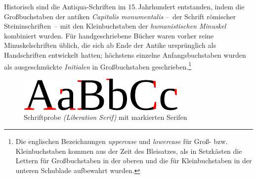 Historisch sind die Antiqua-Schriften im 15.\,Jahrhundert entstanden,
indem die Großbuchstaben der antiken \emph{Capitalis monumentalis}
--~der Schrift römischer Steininschriften~-- mit den Kleinbuchstaben
der \emph{humanistischen Minuskel} kombiniert wurden.  Für
handgeschriebene Bücher waren vorher reine Minuskelschriften üblich,
die sich ab Ende der Antike ursprünglich als Handschriften entwickelt
hatten; höchstens einzelne Anfangsbuchstaben wurden als ausgeschmückte
\emph{Initialen} in Großbuchstaben geschrieben.\footnote{Die
  englischen Bezeichnungen \emph{\foreignlanguage{british}{uppercase}}
  und \emph{\foreignlanguage{british}{lowercase}} für Groß-
  bzw. Kleinbuchstaben kommen aus der Zeit des Bleisatzes, als in
  Setzkästen die Lettern für Großbuchstaben in der oberen und die für
  Kleinbuchstaben in der unteren Schublade aufbewahrt wurden.}

\begin{figure}
  \centering
  \includegraphics[width=.4\textwidth]{Serifen}
  \caption{Schriftprobe \emph{(Liberation Serif)} mit markierten
    Serifen\protect\footnotemark}
  \label{fig:Serifen}
\end{figure}

